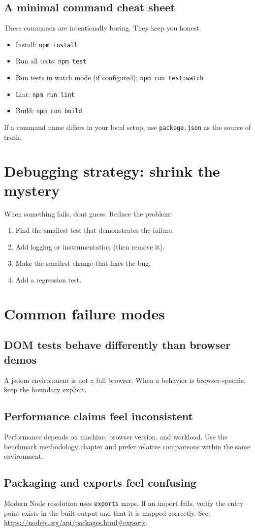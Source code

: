 \subsection{A minimal command cheat sheet}
These commands are intentionally boring.
They keep you honest.

\begin{itemize}
  \item Install: \texttt{npm install}
  \item Run all tests: \texttt{npm test}
  \item Run tests in watch mode (if configured): \texttt{npm run test:watch}
  \item Lint: \texttt{npm run lint}
  \item Build: \texttt{npm run build}
\end{itemize}

If a command name differs in your local setup, use \texttt{package.json} as the source of truth.

\section{Debugging strategy: shrink the mystery}
When something fails, don\textquotesingle t guess.
Reduce the problem:

\begin{enumerate}
  \item Find the smallest test that demonstrates the failure.
  \item Add logging or instrumentation (then remove it).
  \item Make the smallest change that fixes the bug.
  \item Add a regression test.
\end{enumerate}

\section{Common failure modes}
\subsection{DOM tests behave differently than browser demos}
A jsdom environment is not a full browser.
When a behavior is browser-specific, keep the boundary explicit.

\subsection{Performance claims feel inconsistent}
Performance depends on machine, browser version, and workload.
Use the benchmark methodology chapter and prefer relative comparisons within the same environment.

\subsection{Packaging and exports feel confusing}
Modern Node resolution uses \texttt{exports} maps.
If an import fails, verify the entry point exists in the built output and that it is mapped correctly.
See: \href{https://nodejs.org/api/packages.html\#exports}{https://nodejs.org/api/packages.html\#exports}.
